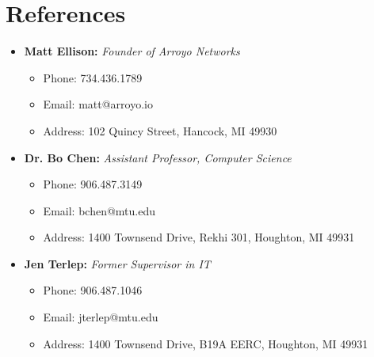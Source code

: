 \documentclass[11pt,a4paper,sans]{moderncv}        %
\begin{document}
\makecvtitle



\section{References}

\vspace{5pt}

\begin{itemize}

\item{\textbf{Matt Ellison:} \textit{Founder of Arroyo Networks}

\vspace{3pt}

\small{
\begin{itemize}
\item Phone: 734.436.1789
\item Email: matt@arroyo.io
\item Address: 102 Quincy Street, Hancock, MI 49930
\end{itemize}
}}

\vspace{6pt}

\item{\textbf{Dr. Bo Chen:} \textit{Assistant Professor, Computer Science}

\vspace{3pt}

\small{
\begin{itemize}
\item Phone: 906.487.3149
\item Email: bchen@mtu.edu
\item Address: 1400 Townsend Drive, Rekhi 301, Houghton, MI 49931
\end{itemize}
}}

\vspace{6pt}

\item{\textbf{Jen Terlep:} \textit{Former Supervisor in IT}

\vspace{3pt}

\small{
\begin{itemize}
\item Phone: 906.487.1046
\item Email: jterlep@mtu.edu
\item Address: 1400 Townsend Drive, B19A EERC, Houghton, MI 49931
\end{itemize}
}}



\end{itemize}
\end{document}
